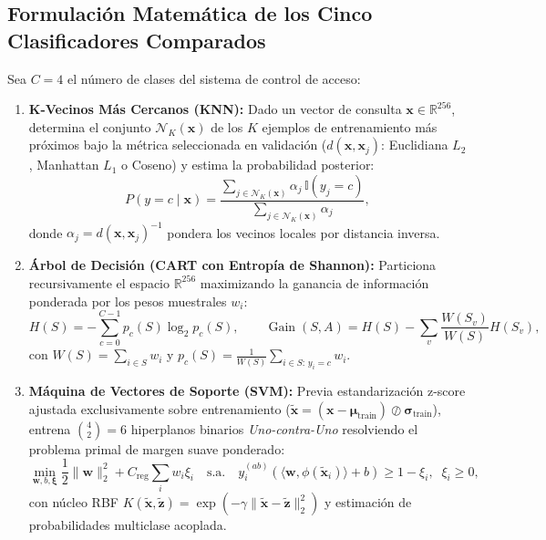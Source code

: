 \documentclass{article}
\begin{document}
\subsection{Formulación Matemática de los Cinco Clasificadores Comparados}
Sea $C = 4$ el número de clases del sistema de control de acceso:
\begin{enumerate}
    \item \textbf{K-Vecinos Más Cercanos (KNN):} Dado un vector de consulta $\mathbf{x} \in \mathbb{R}^{256}$, determina el conjunto $\mathcal{N}_K(\mathbf{x})$ de los $K$ ejemplos de entrenamiento más próximos bajo la métrica seleccionada en validación ($d(\mathbf{x}, \mathbf{x}_j)$: Euclidiana $L_2$, Manhattan $L_1$ o Coseno) y estima la probabilidad posterior:
    \begin{equation}
    P(y = c \mid \mathbf{x}) = \frac{\sum_{j \in \mathcal{N}_K(\mathbf{x})} \alpha_j \, \mathbb{I}(y_j = c)}{\sum_{j \in \mathcal{N}_K(\mathbf{x})} \alpha_j},
    \label{eq:knn}
    \end{equation}
    donde $\alpha_j = d(\mathbf{x}, \mathbf{x}_j)^{-1}$ pondera los vecinos locales por distancia inversa.

    \item \textbf{Árbol de Decisión (CART con Entropía de Shannon):} Particiona recursivamente el espacio $\mathbb{R}^{256}$ maximizando la ganancia de información ponderada por los pesos muestrales $w_i$:
    \begin{equation}
    H(S) = -\sum_{c=0}^{C-1} p_c(S) \log_2 p_c(S), \qquad
    \operatorname{Gain}(S, A) = H(S) - \sum_{v} \frac{W(S_v)}{W(S)} H(S_v),
    \label{eq:arbol_entropia}
    \end{equation}
    con $W(S) = \sum_{i \in S} w_i$ y $p_c(S) = \frac{1}{W(S)}\sum_{i \in S:\, y_i = c} w_i$.

    \item \textbf{Máquina de Vectores de Soporte (SVM):} Previa estandarización z-score ajustada exclusivamente sobre entrenamiento ($\tilde{\mathbf{x}} = (\mathbf{x} - \boldsymbol{\mu}_{\text{train}}) \oslash \boldsymbol{\sigma}_{\text{train}}$), entrena $\binom{4}{2} = 6$ hiperplanos binarios \textit{Uno-contra-Uno} resolviendo el problema primal de margen suave ponderado:
    \begin{equation}
    \min_{\mathbf{w}, b, \boldsymbol{\xi}} \frac{1}{2}\|\mathbf{w}\|_2^2 + C_{\text{reg}} \sum_{i} w_i \xi_i \quad \text{s.a.} \quad y_i^{(ab)}\!\left(\langle \mathbf{w}, \phi(\tilde{\mathbf{x}}_i) \rangle + b\right) \ge 1 - \xi_i,\;\; \xi_i \ge 0,
    \label{eq:svm_primal}
    \end{equation}
    con núcleo RBF $K(\tilde{\mathbf{x}}, \tilde{\mathbf{z}}) = \exp(-\gamma \|\tilde{\mathbf{x}} - \tilde{\mathbf{z}}\|_2^2)$ y estimación de probabilidades multiclase acoplada.


\end{enumerate}
\end{document}
